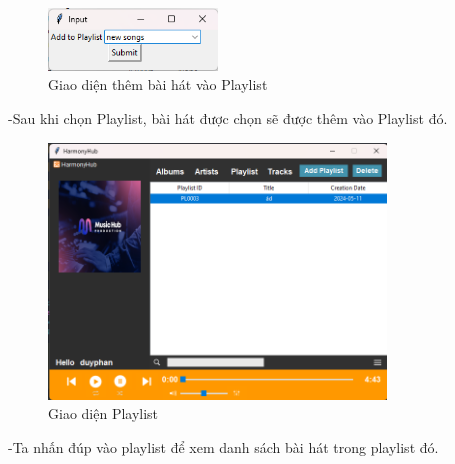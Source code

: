 \documentclass[a4paper]{article}
\begin{document}
\clearpage
\newpage
\begin{flushleft}
	\begin{figure}[h]
		\centering
		\includegraphics[width=0.4\textwidth]{images/newplaylist.png}
		\caption{Giao diện thêm bài hát vào Playlist}
	\end{figure}

	-Sau khi chọn Playlist, bài hát được chọn sẽ được thêm vào Playlist đó.
	\begin{figure}[h]
		\centering
		\includegraphics[width=0.8\textwidth]{images/playlistdetailUI.png}
		\caption{Giao diện Playlist}
	\end{figure}

	-Ta nhấn đúp vào playlist để xem danh sách bài hát trong playlist đó.
\end{flushleft}
\clearpage
\newpage
\end{document}
